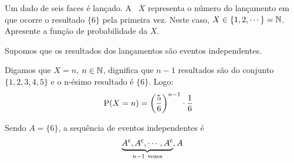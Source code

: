 \begin{example}
    Um dado de seis faces é lançado. A \va\ $X$ representa o número do lançamento
    em que ocorre o resultado $\{6\}$ pela primeira vez. Neste caso,
    $X \in \{1,2,\cdots\} = \operatorname{\mathbb{N}}$. Apresente a função de probabilidade da \va $X$.

    \bigskip
    Supomos que os resultados dos lançamentos são eventos independentes.

    Digamos que $X = n$, $n \in \operatorname{\mathbb{N}}$, dignifica que $n -1$ resultados
    são do conjunto $\{1,2,3,4,5\}$ e o n-ésimo resultado é $\{6\}$.
    Logo:
    \begin{align*}
        \operatorname{P}(X = n) &= \left(\frac{5}{6}\right)^{n-1} \cdot \frac{1}{6}
    \end{align*}

    Sendo $A = \{6\}$, a sequência de eventos independentes é
    \begin{align*}
        \underbrace{{A}^{\mathsf{c}}, {A}^{\mathsf{c}}, \cdots, {A}^{\mathsf{c}}}_
            {n - 1\ \text{vezes}}, A 
    \end{align*}

    \begin{center}
\end{center}
\end{example}
